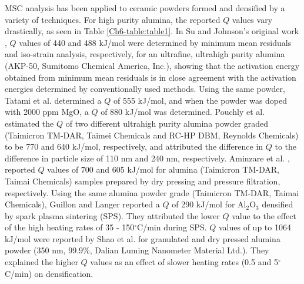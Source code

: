 MSC analysis has been applied to ceramic powders formed and densified by a variety of techniques. For high purity alumina, the reported $Q$ values vary drastically, as seen in Table \ref{Ch6-table:table1}. In Su and Johnson’s original work \cite{Su1996a}, $Q$ values of 440 and 488 kJ/mol were determined by minimum mean residuals and iso-strain analysis, respectively, for an ultrafine, ultrahigh purity alumina (AKP-50, Sumitomo Chemical America, Inc.), showing that the activation energy obtained from minimum mean residuals is in close agreement with the activation energies determined by conventionally used methods. Using the same powder, Tatami et al. \cite{Tatami2006} determined a $Q$ of 555 kJ/mol, and when the powder was doped with 2000 ppm MgO, a $Q$ of 880 kJ/mol was determined. Pouchly et al. \cite{Pouchly2009} estimated the $Q$ of two different ultrahigh purity alumina powder graded (Taimicron TM-DAR, Taimei Chemicals and RC-HP DBM, Reynolds Chemicals) to be 770 and 640 kJ/mol, respectively, and attributed the difference in $Q$ to the difference in particle size of 110 nm and 240 nm, respectively. Aminzare et al. \cite{Aminzare2010}, reported $Q$ values of 700 and 605 kJ/mol for alumina (Taimicron TM-DAR, Taimai Chemicals) samples prepared by dry pressing and pressure filtration, respectively. Using the same alumina powder grade (Taimicron TM-DAR, Taimai Chemicals), Guillon and Langer \cite{Guillon2010} reported a $Q$ of 290 kJ/mol for Al$_{2}$O$_{3}$ densified by spark plasma sintering (SPS). They attributed the lower $Q$ value to the effect of the high heating rates of 35 - 150$^{\circ}$C/min during SPS. $Q$ values of up to 1064 kJ/mol were reported by Shao et al. \cite{Shao2009} for granulated and dry pressed alumina powder (350 nm, 99.9\%, Dalian Luming Nanometer Material Ltd.). They explained the higher $Q$ values as an effect of slower heating rates (0.5 and 5$^{\circ}$C/min) on densification.

